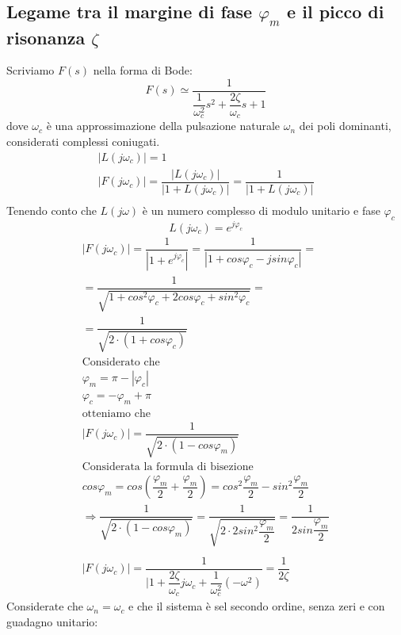 \documentclass[a4paper]{report}
\begin{document}
\subsection{Legame tra il margine di fase $\varphi_m$ e il picco di
  risonanza $\zeta$} 
Scriviamo $F(s)$ nella forma di Bode:
\[
F(s) \simeq \dfrac{1}{\dfrac{1}{\omega_c^2}s^2 + \dfrac{2
    \zeta}{\omega_c}s + 1}
\]
dove $\omega_c$ \`e una approssimazione della pulsazione naturale
$\omega_n$ dei poli dominanti, considerati complessi coniugati.
\[
\begin{array}{l}
  |L(j \omega_c)| = 1\\
  |F(j \omega_c)| = \dfrac{|L(j \omega_c)|}{|1 + L(j \omega_c)|} =
  \dfrac{1}{|1 + L(j \omega_c)|}\\
\end{array}
\]
Tenendo conto che $L(j\omega)$ \`e un numero complesso di modulo
unitario e fase $\varphi_c$
\[
L(j \omega_c) = e^{j \varphi_c}
\]
\[
\begin{array}{l}
  |F(j \omega_c)| = \dfrac{1}{|1 + e^{j \varphi_c}|} = \dfrac{1}{|1 + cos \varphi_c -
    j sin \varphi_c|} =\\
  = \dfrac{1}{\sqrt{1 + cos^2 \varphi_c + 2 cos \varphi_c + sin^2
      \varphi_c}} = \\
  = \dfrac{1}{\sqrt{2 \cdot (1 + cos \varphi_c)}}\\
  \textrm{Considerato che}\\
  \varphi_m = \pi - |\varphi_c|\\
  \varphi_c = -\varphi_m + \pi\\
  \textrm{otteniamo che}\\
  |F(j \omega_c)| = \dfrac{1}{\sqrt{2\cdot (1 - cos \varphi_m)}}\\
  \textrm{Considerata la formula di bisezione }\\
  cos \varphi_m = cos \left( \dfrac{\varphi_m}{2} +
  \dfrac{\varphi_m}{2} \right) = cos^2 \dfrac{\varphi_m}{2} - sin^2
  \dfrac{\varphi_m}{2}\\ 
  \Rightarrow \dfrac{1}{\sqrt{2 \cdot (1 - cos \varphi_m)}} =
  \dfrac{1}{\sqrt{2 \cdot 2 sin^2 \dfrac{\varphi_m}{2}}} =
  \dfrac{1}{2 sin \dfrac{\varphi_m}{2}}\\
  \\
  |F(j \omega_c)| = \dfrac{1}{|1 + \dfrac{2 \zeta}{\omega_c} j
    \omega_c + \dfrac{1}{\omega_c^2}(- \omega^2)} = \dfrac{1}{2 \zeta}
\end{array}
\]
Considerate che $\omega_n = \omega_c$ e che il sistema \`e sel secondo
ordine, senza zeri e con guadagno unitario:
\end{document}
